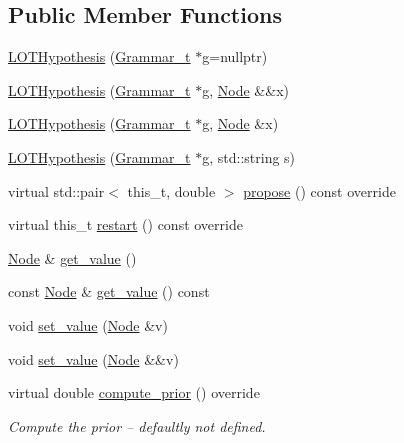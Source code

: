 \subsection*{Public Member Functions}
\begin{DoxyCompactItemize}
\item 
\hyperlink{class_l_o_t_hypothesis_afdec7677defa1f7b860ec8708ce0775e}{L\+O\+T\+Hypothesis} (\hyperlink{class_l_o_t_hypothesis_a5393058e614835e0f139bd40acb183b2}{Grammar\+\_\+t} $\ast$g=nullptr)
\item 
\hyperlink{class_l_o_t_hypothesis_a96d283ef0e69bbf25b139b10ccb948de}{L\+O\+T\+Hypothesis} (\hyperlink{class_l_o_t_hypothesis_a5393058e614835e0f139bd40acb183b2}{Grammar\+\_\+t} $\ast$g, \hyperlink{class_node}{Node} \&\&x)
\item 
\hyperlink{class_l_o_t_hypothesis_a62a7f0b9fa6f2c409395428e1234dd52}{L\+O\+T\+Hypothesis} (\hyperlink{class_l_o_t_hypothesis_a5393058e614835e0f139bd40acb183b2}{Grammar\+\_\+t} $\ast$g, \hyperlink{class_node}{Node} \&x)
\item 
\hyperlink{class_l_o_t_hypothesis_a070478ca663d496087c58a8caec65bf3}{L\+O\+T\+Hypothesis} (\hyperlink{class_l_o_t_hypothesis_a5393058e614835e0f139bd40acb183b2}{Grammar\+\_\+t} $\ast$g, std\+::string s)
\item 
virtual std\+::pair$<$ this\+\_\+t, double $>$ \hyperlink{class_l_o_t_hypothesis_a0b1aac85e8c09fbdf438e6bf443951b7}{propose} () const override
\item 
virtual this\+\_\+t \hyperlink{class_l_o_t_hypothesis_ab058030e50b719fdbc84544aad712eed}{restart} () const override
\item 
\hyperlink{class_node}{Node} \& \hyperlink{class_l_o_t_hypothesis_ac1eb445a699bb8432ddee1052a8d5a58}{get\+\_\+value} ()
\item 
const \hyperlink{class_node}{Node} \& \hyperlink{class_l_o_t_hypothesis_a98da5e5ee9682d2f265017546c641c73}{get\+\_\+value} () const
\item 
void \hyperlink{class_l_o_t_hypothesis_a8726ec9e602392436d2e9f33fb3dcfd6}{set\+\_\+value} (\hyperlink{class_node}{Node} \&v)
\item 
void \hyperlink{class_l_o_t_hypothesis_a89b8752847c12768f3eb631ce939bb34}{set\+\_\+value} (\hyperlink{class_node}{Node} \&\&v)
\item 
virtual double \hyperlink{class_l_o_t_hypothesis_a32135631f7311a9a4a5a43c3f2ddfd6b}{compute\+\_\+prior} () override
\begin{DoxyCompactList}\small\item\em Compute the prior -- defaultly not defined. \end{DoxyCompactList}\item 

\end{DoxyCompactItemize}
